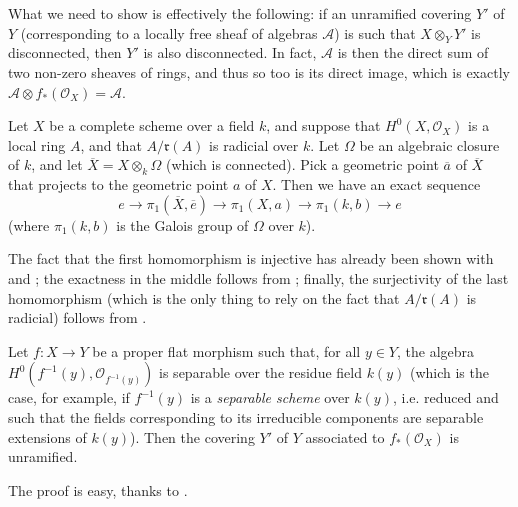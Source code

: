 What we need to show is effectively the following: if an unramified covering $Y'$ of $Y$ (corresponding to a locally free sheaf of algebras $\mathcal{A}$) is such that $X\otimes_YY'$ is disconnected, then $Y'$ is also disconnected.
In fact, $\mathcal{A}$ is then the direct sum of two non-zero sheaves of rings, and thus so too is its direct image, which is exactly $\mathcal{A}\otimes f_*(\mathcal{O}_X)=\mathcal{A}$.


\begin{lemma}\label{fga2-lemma-5}

    Let $X$ be a complete scheme over a field $k$, and suppose that $H^0(X,\mathcal{O}_X)$ is a local ring $A$, and that $A/\mathfrak{r}(A)$ is radicial over $k$.
    Let $\Omega$ be an algebraic closure of $k$, and let $\overline{X}=X\otimes_k\Omega$ (which is connected).
    Pick a geometric point $\overline{a}$ of $\overline{X}$ that projects to the geometric point $a$ of $X$.
    Then we have an exact sequence
    \[
        e
        \to \pi_1(\overline{X},\overline{e})
        \to \pi_1(X,a)
        \to \pi_1(k,b)
        \to e
    \]
    (where $\pi_1(k,b)$ is the Galois group of $\Omega$ over $k$).
\end{lemma}

\begin{cproof}
    The fact that the first homomorphism is injective has already been shown with  and ;
    the exactness in the middle follows from ;
    finally, the surjectivity of the last homomorphism (which is the only thing to rely on the fact that $A/\mathfrak{r}(A)$ is radicial) follows from .
\end{cproof}

\begin{proposition}\label{fga2-proposition-4}
    Let $f\colon X\to Y$ be a proper flat morphism such that, for all $y\in Y$, the algebra $H^0(f^{-1}(y),\mathcal{O}_{f^{-1}(y)})$ is separable over the residue field $k(y)$ (which is the case, for example, if $f^{-1}(y)$ is a \emph{separable scheme} over $k(y)$, i.e. reduced and such that the fields corresponding to its irreducible components are separable extensions of $k(y)$).
    Then the covering $Y'$ of $Y$ associated to $f_*(\mathcal{O}_X)$ is unramified.
\end{proposition}

\begin{cproof}
    The proof is easy, thanks to .
\end{cproof}


